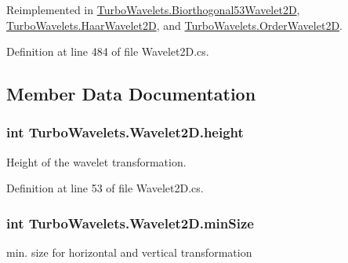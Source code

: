 \-Reimplemented in \hyperlink{class_turbo_wavelets_1_1_biorthogonal53_wavelet2_d_acec9bb2730e6dee78c8f6d5c8d79a523}{\-Turbo\-Wavelets.\-Biorthogonal53\-Wavelet2\-D}, \hyperlink{class_turbo_wavelets_1_1_haar_wavelet2_d_a55f6abb99bf5d87017e715b63f64cc15}{\-Turbo\-Wavelets.\-Haar\-Wavelet2\-D}, and \hyperlink{class_turbo_wavelets_1_1_order_wavelet2_d_af45baa14b0d867362b989db7d41f14dc}{\-Turbo\-Wavelets.\-Order\-Wavelet2\-D}.



\-Definition at line 484 of file \-Wavelet2\-D.\-cs.



\subsection{\-Member \-Data \-Documentation}
\hypertarget{class_turbo_wavelets_1_1_wavelet2_d_afb2aa87b89b82f329357cbdc0cde18a8}{
\subsubsection[{height}]{\setlength{\rightskip}{0pt plus 5cm}int {\bf \-Turbo\-Wavelets.\-Wavelet2\-D.\-height}}}\label{class_turbo_wavelets_1_1_wavelet2_d_afb2aa87b89b82f329357cbdc0cde18a8}


\-Height of the wavelet transformation. 



\-Definition at line 53 of file \-Wavelet2\-D.\-cs.

\hypertarget{class_turbo_wavelets_1_1_wavelet2_d_af5148ef1a46dd5694ccea13aa8f1b9e2}{
\subsubsection[{min\-Size}]{\setlength{\rightskip}{0pt plus 5cm}int {\bf \-Turbo\-Wavelets.\-Wavelet2\-D.\-min\-Size}}}\label{class_turbo_wavelets_1_1_wavelet2_d_af5148ef1a46dd5694ccea13aa8f1b9e2}


min. size for horizontal and vertical transformation 



